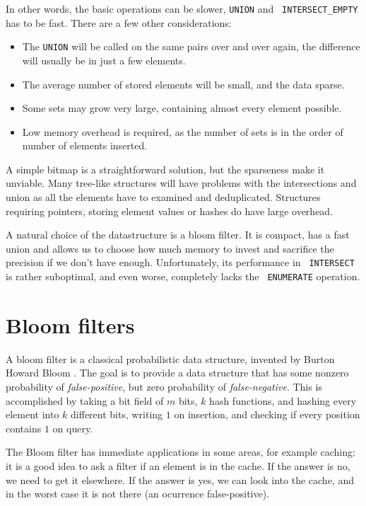 In other words, the basic operations can be slower, {\tt UNION} and {\tt
INTERSECT\_EMPTY} has to be fast. There are a few other considerations:

\begin{itemize}
	\item The {\tt UNION} will be called on the same pairs over and over again,
		the difference will usually be in just a few elements.
	\item The average number of stored elements will be small, and the data sparse.
	\item Some sets may grow very large, containing almost every element possible.
	\item Low memory overhead is required, as the number of sets is in the order
		of number of elements inserted.
\end{itemize}

A simple bitmap is a straightforward solution, but the sparseness make it
unviable. Many tree-like structures will have problems with the intersections
and union as all the elements have to examined and deduplicated. Structures
requiring pointers, storing element values or hashes do have large overhead.

A natural choice of the datastructure is a bloom filter. It is compact, has a
fast union and allows us to choose how much memory to invest and sacrifice the
precision if we don't have enough. Unfortunately, its performance in {\tt
INTERSECT} is rather suboptimal, and even worse, completely lacks the {\tt
ENUMERATE} operation.


\section{Bloom filters}

A bloom filter is a classical probabilistic data structure, invented by Burton
Howard Bloom \cite{Bloom1970}. The goal is to provide a data structure
that has some nonzero probability of {\it false-positive}, but zero probability
of {\it false-negative}. This is accomplished by taking a bit field of $m$ bits,
$k$ hash functions, and hashing every element into $k$ different bits, writing
$1$ on insertion, and checking if every position contains $1$ on query.

The Bloom filter has immediate applications in some areas, for example caching:
it is a good idea to ask a filter if an element is in the cache. If the answer is
no, we need to get it elsewhere. If the answer is yes, we can look into the
cache, and in the worst case it is not there (an ocurrence false-positive).

